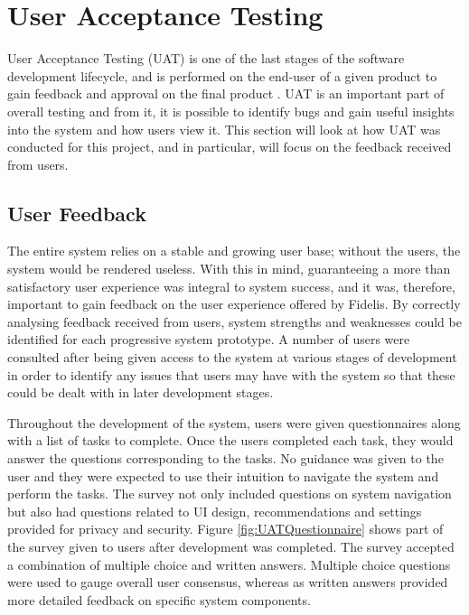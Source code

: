 \section{User Acceptance Testing}
User Acceptance Testing (UAT) is one of the last stages of the software development lifecycle, and is performed on the end-user of a given product to gain feedback and approval on the final product \cite{EconomicTimes:UAT}. UAT is an important part of overall testing and from it, it is possible to identify bugs and gain useful insights into the system and how users view it. This section will look at how UAT was conducted for this project, and in particular, will focus on the feedback received from users.

\subsection{User Feedback}
The entire system relies on a stable and growing user base; without the users, the system would be rendered useless. With this in mind, guaranteeing a more than satisfactory user experience was integral to system success, and it was, therefore, important to gain feedback on the user experience offered by Fidelis. By correctly analysing feedback received from users, system strengths and weaknesses could be identified for each progressive system prototype. A number of users were consulted after being given access to the system at various stages of development in order to identify any issues that users may have with the system so that these could be dealt with in later development stages.

Throughout the development of the system, users were given questionnaires along with a list of tasks to complete. Once the users completed each task, they would answer the questions corresponding to the tasks. No guidance was given to the user and they were expected to use their intuition to navigate the system and perform the tasks. The survey not only included questions on system navigation but also had questions related to UI design, recommendations and settings provided for privacy and security. Figure \ref{fig:UATQuestionnaire} shows part of the survey given to users after development was completed. The survey accepted a combination of multiple choice and written answers. Multiple choice questions were used to gauge overall user consensus, whereas as written answers provided more detailed feedback on specific system components.

